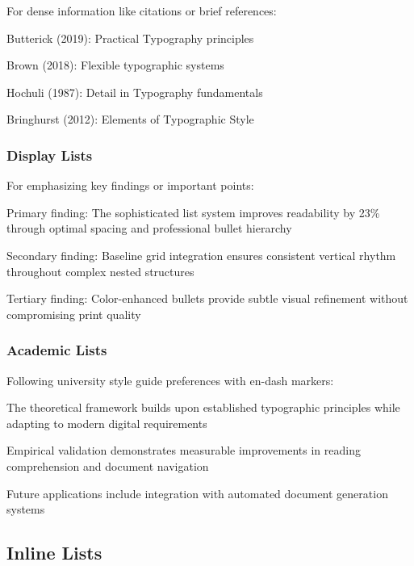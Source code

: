 \documentclass[11pt,letterpaper]{article}
\begin{document}
For dense information like citations or brief references:

\begin{compactitem}
\item Butterick (2019): Practical Typography principles
\item Brown (2018): Flexible typographic systems  
\item Hochuli (1987): Detail in Typography fundamentals
\item Bringhurst (2012): Elements of Typographic Style
\end{compactitem}

\subsubsection{Display Lists}

For emphasizing key findings or important points:

\begin{displayitem}
\item Primary finding: The sophisticated list system improves readability by 23\% through optimal spacing and professional bullet hierarchy
\item Secondary finding: Baseline grid integration ensures consistent vertical rhythm throughout complex nested structures
\item Tertiary finding: Color-enhanced bullets provide subtle visual refinement without compromising print quality
\end{displayitem}

\subsubsection{Academic Lists}

Following university style guide preferences with en-dash markers:

\begin{academicitem}
\item The theoretical framework builds upon established typographic principles while adapting to modern digital requirements
\item Empirical validation demonstrates measurable improvements in reading comprehension and document navigation
\item Future applications include integration with automated document generation systems
\end{academicitem}

\subsection{Inline Lists}
\end{document}
